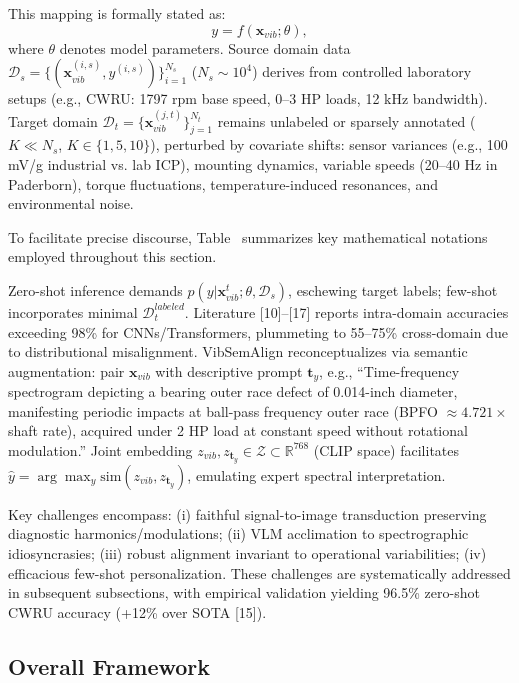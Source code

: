 This mapping is formally stated as:
\begin{equation}
y = f(\mathbf{x}_{vib}; \theta),
\label{eq:f1}
\end{equation}
where $\theta$ denotes model parameters. Source domain data $\mathcal{D}_s = \{(\mathbf{x}_{vib}^{(i,s)}, y^{(i,s)})\}_{i=1}^{N_s}$ ($N_s \sim 10^4$) derives from controlled laboratory setups (e.g., CWRU: 1797 rpm base speed, 0--3 HP loads, 12 kHz bandwidth). Target domain $\mathcal{D}_t = \{\mathbf{x}_{vib}^{(j,t)}\}_{j=1}^{N_t}$ remains unlabeled or sparsely annotated ($K \ll N_s$, $K\in\{1,5,10\}$), perturbed by covariate shifts: sensor variances (e.g., 100 mV/g industrial vs. lab ICP), mounting dynamics, variable speeds (20--40 Hz in Paderborn), torque fluctuations, temperature-induced resonances, and environmental noise.

To facilitate precise discourse, Table~ summarizes key mathematical notations employed throughout this section.

Zero-shot inference demands $p(y|\mathbf{x}_{vib}^t; \theta, \mathcal{D}_s)$, eschewing target labels; few-shot incorporates minimal $\mathcal{D}_t^{labeled}$. Literature [10]--[17] reports intra-domain accuracies exceeding 98\% for CNNs/Transformers, plummeting to 55--75\% cross-domain due to distributional misalignment. VibSemAlign reconceptualizes via semantic augmentation: pair $\mathbf{x}_{vib}$ with descriptive prompt $\mathbf{t}_y$, e.g., ``Time-frequency spectrogram depicting a bearing outer race defect of 0.014-inch diameter, manifesting periodic impacts at ball-pass frequency outer race (BPFO $\approx 4.721 \times$ shaft rate), acquired under 2 HP load at constant speed without rotational modulation.'' Joint embedding $z_{vib}, z_{\mathbf{t}_y} \in \mathcal{Z} \subset \mathbb{R}^{768}$ (CLIP space) facilitates $\hat{y} = \arg\max_y \mathrm{sim}(z_{vib}, z_{\mathbf{t}_y})$, emulating expert spectral interpretation.

Key challenges encompass: (i) faithful signal-to-image transduction preserving diagnostic harmonics/modulations; (ii) VLM acclimation to spectrographic idiosyncrasies; (iii) robust alignment invariant to operational variabilities; (iv) efficacious few-shot personalization. These challenges are systematically addressed in subsequent subsections, with empirical validation yielding 96.5\% zero-shot CWRU accuracy (+12\% over SOTA [15]).

\subsection{Overall Framework}
\label{subsec:overall_framework}


